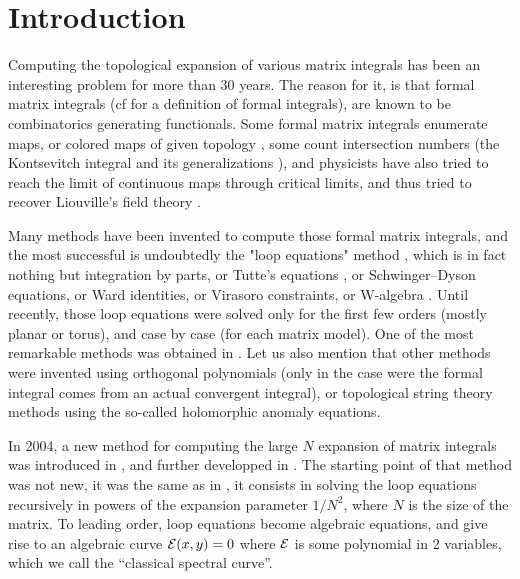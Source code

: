 
\section{Introduction}

Computing the topological expansion of various matrix integrals has been an interesting problem for more than 30 years. The reason for it, is that formal matrix integrals (cf \cite{eynform} for a definition of formal integrals), are known to be combinatorics generating functionals.
Some formal matrix integrals enumerate maps, or colored maps of given topology \cite{BIPZ, ZJDFG, PDFgraph}, 
some count intersection numbers (the Kontsevitch integral and its generalizations \cite{kontsevitch}), 
and physicists have also tried to reach the limit of continuous maps through critical limits, and thus tried to recover Liouville's field theory \cite{KPZ, BookPDF}.

\medskip

Many methods have been invented to compute those formal matrix integrals, and the most successful
is undoubtedly the "loop equations" method \cite{Kazakovloop, Virasoro}, which is in fact nothing but integration by parts, or Tutte's equations \cite{tutte,tutte2}, or Schwinger--Dyson equations, or Ward identities, or Virasoro constraints, or W-algebra \cite{ZJDFG}.
Until recently, those loop equations were solved only for the first few orders (mostly planar or torus), and case by case (for each matrix model).
One of the most remarkable methods was obtained in \cite{ACKM}.
Let us also mention that other methods were invented using orthogonal polynomials \cite{Mehta} (only in the case were the formal integral comes from an actual convergent integral),
or topological string theory methods \cite{MMtopo,DV,BCOV} using the so-called holomorphic anomaly equations.


\medskip

In 2004, a new method for computing the large $N$ expansion of matrix integrals was introduced in \cite{eynloop1mat}, and further developped in \cite{eyno, ec1loopF}.
The starting point of that method was not new, it was the same as in \cite{ACKM}, it consists in solving the loop equations recursively in powers of the expansion parameter $1/N^2$, where $N$ is the size of the matrix.
To leading order, loop equations become algebraic equations, and give rise to an algebraic curve ${\cal E}(x,y)=0$ where ${\cal E}$ is some polynomial in 2 variables, which we call the ``classical  spectral curve''.

